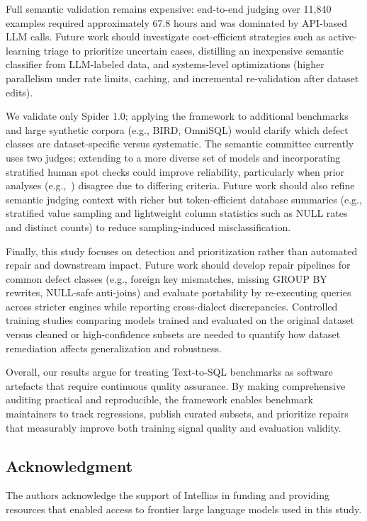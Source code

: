 \documentclass[]{einformatica}
\begin{document}
Full semantic validation remains expensive: end-to-end judging over 11,840 examples required approximately 67.8 hours and was dominated by API-based LLM calls. Future work should investigate cost-efficient strategies such as active-learning triage to prioritize uncertain cases, distilling an inexpensive semantic classifier from LLM-labeled data, and systems-level optimizations (higher parallelism under rate limits, caching, and incremental re-validation after dataset edits). 

We validate only Spider 1.0; applying the framework to additional benchmarks and large synthetic corpora (e.g., BIRD, OmniSQL) would clarify which defect classes are dataset-specific versus systematic. The semantic committee currently uses two judges; extending to a more diverse set of models and incorporating stratified human spot checks could improve reliability, particularly when prior analyses (e.g.,~\cite{liu2025nl2sqlbugs}) disagree due to differing criteria. Future work should also refine semantic judging context with richer but token-efficient database summaries (e.g., stratified value sampling and lightweight column statistics such as NULL rates and distinct counts) to reduce sampling-induced misclassification.

Finally, this study focuses on detection and prioritization rather than automated repair and downstream impact. Future work should develop repair pipelines for common defect classes (e.g., foreign key mismatches, missing GROUP BY rewrites, NULL-safe anti-joins) and evaluate portability by re-executing queries across stricter engines while reporting cross-dialect discrepancies. Controlled training studies comparing models trained and evaluated on the original dataset versus cleaned or high-confidence subsets are needed to quantify how dataset remediation affects generalization and robustness.

Overall, our results argue for treating Text-to-SQL benchmarks as software artefacts that require continuous quality assurance. By making comprehensive auditing practical and reproducible, the framework enables benchmark maintainers to track regressions, publish curated subsets, and prioritize repairs that measurably improve both training signal quality and evaluation validity.

\subsection*{Acknowledgment}

The authors acknowledge the support of Intellias in funding and providing resources that enabled access to frontier large language models used in this study.
\end{document}
